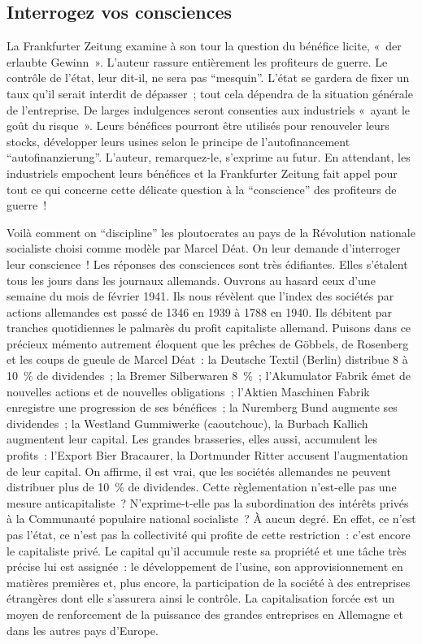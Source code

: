 \documentclass[french,twoside]{book} %
\begin{document}
\subsection[Interrogez vos consciences]{Interrogez vos consciences}
\noindent La Frankfurter Zeitung examine à son tour la question du bénéfice licite, « der erlaubte Gewinn ». L’auteur rassure entièrement les profiteurs de guerre. Le contrôle de l’état, leur dit-il, ne sera pas “mesquin”. L’état se gardera de fixer un taux qu’il serait interdit de dépasser ; tout cela dépendra de la situation générale de l’entreprise. De larges indulgences seront consenties aux industriels « ayant le goût du risque ». Leurs bénéfices pourront être utilisés pour renouveler leurs stocks, développer leurs usines selon le principe de l’autofinancement “autofinanzierung”. L’auteur, remarquez-le, s’exprime au futur. En attendant, les industriels empochent leurs bénéfices et la Frankfurter Zeitung fait appel pour tout ce qui concerne cette délicate question à la “conscience” des profiteurs de guerre !\par
Voilà comment on “discipline” les ploutocrates au pays de la Révolution nationale socialiste choisi comme modèle par Marcel Déat. On leur demande d’interroger leur conscience ! Les réponses des consciences sont très édifiantes. Elles s’étalent tous les jours dans les journaux allemands. Ouvrons au hasard ceux d’une semaine du mois de février 1941. Ils nous révèlent que l’index des sociétés par actions allemandes est passé de 1346 en 1939 à 1788 en 1940. Ils débitent par tranches quotidiennes le palmarès du profit capitaliste allemand. Puisons dans ce précieux mémento autrement éloquent que les prêches de Göbbels, de Rosenberg et les coups de gueule de Marcel Déat : la Deutsche Textil (Berlin) distribue 8 à 10 \% de dividendes ; la Bremer Silberwaren 8 \% ; l’Akumulator Fabrik émet de nouvelles actions et de nouvelles obligations ; l’Aktien Maschinen Fabrik enregistre une progression de ses bénéfices ; la Nuremberg Bund augmente ses dividendes ; la Westland Gummiwerke (caoutchouc), la Burbach Kallich augmentent leur capital. Les grandes brasseries, elles aussi, accumulent les profits : l’Export Bier Bracaurer, la Dortmunder Ritter accusent l’augmentation de leur capital. On affirme, il est vrai, que les sociétés allemandes ne peuvent distribuer plus de 10 \% de dividendes. Cette règlementation n’est-elle pas une mesure anticapitaliste ? N’exprime-t-elle pas la subordination des intérêts privés à la Communauté populaire national socialiste ? À aucun degré. En effet, ce n’est pas l’état, ce n’est pas la collectivité qui profite de cette restriction : c’est encore le capitaliste privé. Le capital qu’il accumule reste sa propriété et une tâche très précise lui est assignée : le développement de l’usine, son approvisionnement en matières premières et, plus encore, la participation de la société à des entreprises étrangères dont elle s’assurera ainsi le contrôle. La capitalisation forcée est un moyen de renforcement de la puissance des grandes entreprises en Allemagne et dans les autres pays d’Europe.
\end{document}
